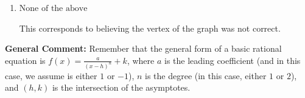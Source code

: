 \documentclass{extbook}[14pt]
\begin{document}
\begin{enumerate}
{\begin{enumerate}[label=\Alph*.]
Corresponds to using the general form $f(x) = \frac{a}{(x+h)^2}+k$ and the opposite leading coefficient.
\item \( \text{None of the above} \)

This corresponds to believing the vertex of the graph was not correct.
\end{enumerate}

\textbf{General Comment:} Remember that the general form of a basic rational equation is $ f(x) = \frac{a}{(x-h)^n} + k$, where $a$ is the leading coefficient (and in this case, we assume is either $1$ or $-1$), $n$ is the degree (in this case, either $1$ or $2$), and $(h, k)$ is the intersection of the asymptotes.
}
\end{enumerate}
\end{document}
